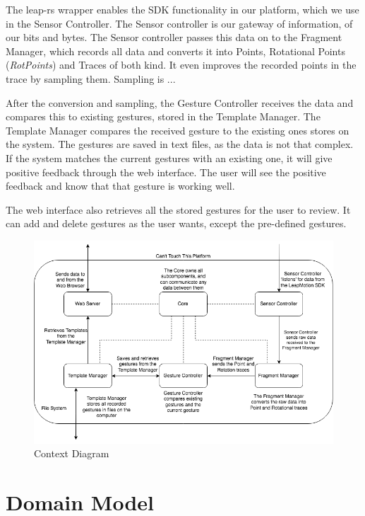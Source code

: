 \documentclass[a4paper]{article}
\begin{document}
  The leap-rs wrapper enables the SDK functionality in our platform, which we
  use in the Sensor Controller. The Sensor controller is our gateway of
  information, of our bits and bytes. The Sensor controller passes this data on
  to the Fragment Manager, which records all data and converts it into Points,
  Rotational Points (\textit{RotPoints}) and Traces of both kind. It even
  improves the recorded points in the trace by sampling them. Sampling is ...

  After the conversion and sampling, the Gesture Controller receives the data
  and compares this to existing gestures, stored in the Template Manager. The
  Template Manager compares the received gesture to the existing ones stores on
  the system. The gestures are saved in text files, as the data is not that
  complex. If the system matches the current gestures with an existing one, it
  will give positive feedback through the web interface. The user will see the
  positive feedback and know that that gesture is working well.

  The web interface also retrieves all the stored gestures for the user to
  review. It can add and delete gestures as the user wants, except the
  pre-defined gestures.

  \begin{figure}[h]
    \caption{Context Diagram}
    \centering
    \includegraphics[width=\linewidth]{functional-diagram}
  \end{figure}
  \clearpage

  \section{Domain Model}
  \clearpage
\end{document}
